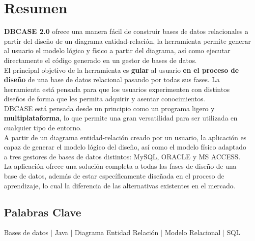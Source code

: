 \chapter{Resumen}%
\textbf{DBCASE 2.0} ofrece una manera fácil de construir bases de datos relacionales a partir del diseño de un diagrama entidad-relación, la herramienta permite generar al usuario el modelo lógico y físico a partir del diagrama, así como ejecutar directamente el código generado en un gestor de bases de datos.\\

El principal objetivo de la herramienta es \textbf{guiar} al usuario \textbf{en el proceso de diseño} de una base de datos relacional pasando por todas sus fases. La herramienta está pensada para que los usuarios experimenten con distintos diseños de forma que les permita adquirir y asentar conocimientos.\\

DBCASE está pensada desde un principio como un programa ligero y \textbf{multiplataforma}, lo que permite una gran versatilidad para ser utilizada en cualquier tipo de entorno.\\

A partir de un diagrama entidad-relación creado por un usuario, la aplicación es capaz de generar el modelo lógico del diseño, así como el modelo físico adaptado a tres gestores de bases de datos distintos: MySQL, ORACLE y MS ACCESS.\\

La aplicación ofrece una solución completa a todas las fases de diseño de una base de datos, además de estar específicamente diseñada en el proceso de aprendizaje, lo cual la diferencia de las alternativas existentes en el mercado.
\section{Palabras Clave}
Bases de datos | Java | Diagrama Entidad Relación | Modelo Relacional | SQL